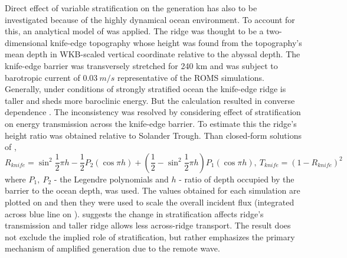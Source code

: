 \documentclass[12pt]{article}
\begin{document}
Direct effect of variable stratification on the generation has also to be investigated because of 
the highly dynamical ocean environment. To account for this, an analytical model of 
\cite{st2003generation} was applied. The ridge was thought to be a two-dimensional knife-edge 
topography whose height was found from the topography's mean depth in WKB-scaled vertical 
coordinate \citep{althaus2003internal} relative to the abyssal depth. The knife-edge barrier was  
transversely stretched for 240 km and was subject to barotropic current of $0.03~m/s$ 
representative of the ROMS simulations. Generally, under conditions of strongly stratified ocean 
the knife-edge ridge is taller and sheds more baroclinic energy. But the calculation resulted in 
converse dependence . The inconsistency was resolved by 
considering effect of stratification on energy transmission across the knife-edge barrier. To 
estimate this the ridge's height ratio was obtained relative to Solander Trough. Than closed-form 
solutions of \citep{larsen1969internal},
\begin{equation}
\label{C3.eq:ke_transm}
R_{knife} = \sin^2 \frac{1}{2} \pi h - \frac{1}{2} P_2( \cos \pi h ) + (\frac{1}{2} - \sin^2 
\frac{1}{2} \pi h) P_1( \cos \pi h ),~
T_{knife} = (1 - R_{knife})^2
\end{equation}
where $P_1,~P_2$ - the Legendre polynomials and $h$ - ratio of depth occupied by the barrier to 
the ocean depth, was used. The values obtained for each simulation are plotted on 
 and then they were used to scale the overall 
incident flux (integrated across blue line on ). 
 suggests the change in stratification affects ridge's transmission 
and taller ridge allows less across-ridge transport. The result does not exclude the implied role 
of stratification, but rather emphasizes the primary mechanism of amplified generation due to the 
remote wave.\\
\end{document}
